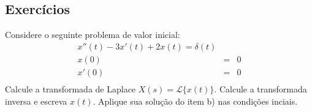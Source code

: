  \subsection*{Exercícios}
\begin{exer}
Considere o seguinte problema de valor inicial:
 \begin{eqnarray*}
x''(t)-3x'(t)+2x(t)=\delta(t)\\
x(0)&=& 0\\
x'(0)&=& 0\\
\end{eqnarray*}
   Calcule a transformada de Laplace $X(s)=\mathcal{L}\{x(t)\}$.
  Calcule a transformada inversa e escreva $x(t)$.
 Aplique sua solução do item b) nas condições inciais.\\

\end{exer}


